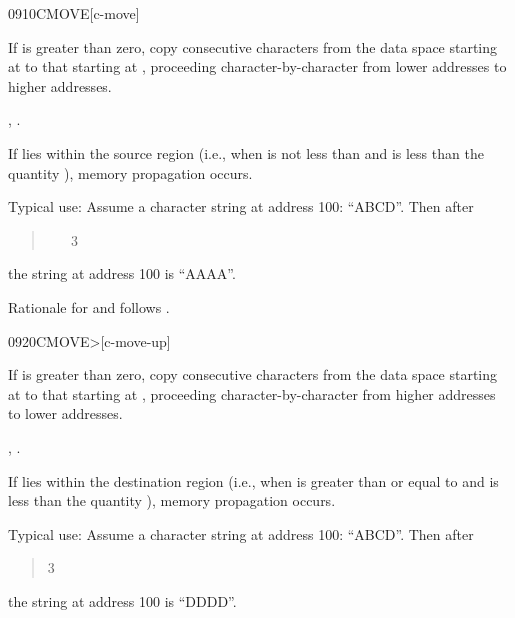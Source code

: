 \begin{worddef}{0910}{CMOVE}[c-move]
\item {}

	If  is greater than zero, copy  consecutive
	characters from the data space starting at  to
	that starting at , proceeding character-by-character
	from lower addresses to higher addresses.

\see {}, .

	\begin{rationale} %
		If  lies within the source region (i.e., when
		 is not less than  and
		 is less than the quantity 
		 \word[core]{+}), memory propagation occurs.

		Typical use: Assume a character string at address
		100: ``ABCD''. Then after
		\begin{quote}  ~  ~ 3 
		\end{quote}
		the string at address 100 is ``AAAA''.

		Rationale for  and  follows
		.
	\end{rationale}
\end{worddef}


\begin{worddef}[CMOVEtop]{0920}{CMOVE>}[c-move-up]
\item {}

	If  is greater than zero, copy  consecutive
	characters from the data space starting at  to
	that starting at , proceeding character-by-character
	from higher addresses to lower addresses.

\see {}, .

	\begin{rationale} %
		If  lies within the destination region (i.e.,
		when  is greater than or equal to
		 and  is less than the
		quantity  
		\word[core]{+}), memory propagation	occurs.

		Typical use: Assume a character string at address
		100: ``ABCD''. Then after
		\begin{quote}   
			3 
		\end{quote}
		the string at address 100 is ``DDDD''.
	\end{rationale}
\end{worddef}


